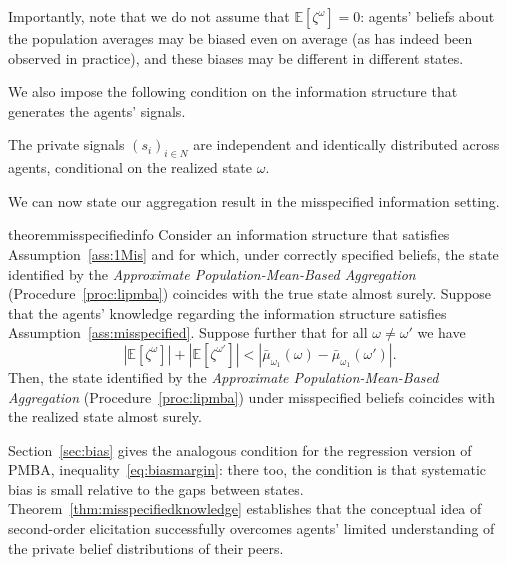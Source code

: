 \documentclass[12pt,reqno]{amsart}
\begin{document}
Importantly, note that we do not assume that $\mathbb{E}[\zeta^\omega]=0$: agents' beliefs about the population averages may be biased even on average (as has indeed been observed in practice), and these biases may be different in different states.

We also impose the following condition on the information structure that generates the agents' signals.
\begin{assumption}\label{ass:1Mis}
The private signals $(s_i)_{i\in N}$ are independent and identically distributed across agents, conditional on the realized state $\omega$.
\end{assumption}



We can now state our aggregation result in the misspecified information setting.


\begin{restatable}{theorem}{misspecifiedinfo}\label{thm:misspecifiedknowledge}
Consider an information structure that satisfies Assumption~\ref{ass:1Mis} and for which, under correctly specified beliefs, the state identified by the \emph{Approximate Population-Mean-Based Aggregation} (Procedure~\ref{proc:lipmba}) coincides with the true state almost surely. Suppose that the agents' knowledge regarding the information structure satisfies Assumption~\ref{ass:misspecified}. Suppose further that for all $\omega \neq \omega'$ we have
\begin{equation}\label{eqn:misspecifiedinfocondn}
\left\vert \mathbb{E}[\zeta ^{\omega}]\right\vert +\left\vert \mathbb{E}[\zeta ^{\omega'}]\right\vert <
\left\vert \bar{\mu}_{\omega_1}\left(\omega\right) -\bar{\mu}_{\omega_1}\left(\omega'\right) \right \vert.
\end{equation}
Then, the state identified by the \emph{Approximate Population-Mean-Based Aggregation} (Procedure~\ref{proc:lipmba}) under misspecified beliefs coincides with the realized state almost surely.
\end{restatable}

Section~\ref{sec:bias} gives the analogous condition for the regression version of PMBA, inequality~\eqref{eq:biasmargin}: there too, the condition is that systematic bias is small relative to the gaps between states.
Theorem~\ref{thm:misspecifiedknowledge} establishes that the conceptual idea of second-order elicitation successfully overcomes agents' limited understanding of the private belief distributions of their peers.
\end{document}
